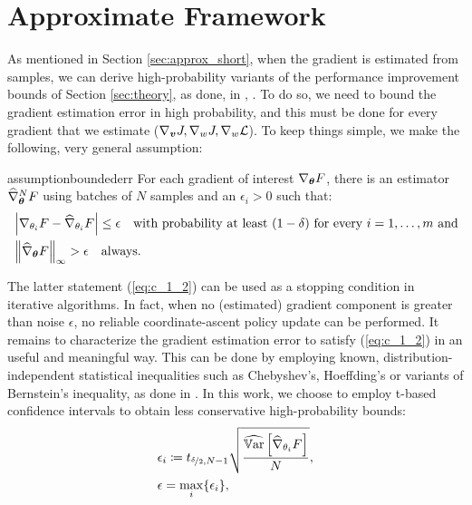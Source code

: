 \chapter{Approximate Framework}\label{sec:approx}
As mentioned in Section \ref{sec:approx_short}, when the gradient is estimated from samples, we can derive high-probability variants of the performance improvement bounds of Section \ref{sec:theory}, as done, \eg in \cite{adaptive_step}, \cite{adaptive_batch}.
To do so, we need to bound the gradient estimation error in high probability, and this must be done for every gradient that we estimate (\eg $\nabla_{\vv}J, \nabla_wJ, \nabla_w\mathcal{L}$). To keep things simple, we make the following, very general assumption:

\begin{restatable}[]{assumption}{boundederr}\label{ass:bounded_err}
	For each gradient of interest $\nabla_{\vtheta} F$, there is an estimator $\widehat{\nabla}_{\vtheta}^NF$ using batches of $N$ samples and an $\epsilon_i>0$ such that:
	\begin{align}
	&\left|\nabla_{\theta_i}F - \widehat{\nabla}_{\theta_i}F\right| \leq \epsilon 
		\quad\text{with probability at least $(1-\delta)$ for every $i=1,\dots,m$ and}\label{eq:c_1_1}\\
	&\norm[\infty]{\widehat{\nabla}_{\vtheta}F} > \epsilon\quad\text{always}.\label{eq:c_1_2}
	\end{align}
\end{restatable}
The latter statement (\ref{eq:c_1_2}) can be used as a stopping condition in iterative algorithms. In fact, when no (estimated) gradient component is greater than noise $\epsilon$, no reliable coordinate-ascent policy update can be performed. It remains to characterize the gradient estimation error to satisfy (\ref{eq:c_1_2}) in an useful and meaningful way. This can be done by employing known, distribution-independent statistical inequalities such as Chebyshev's, Hoeffding's or variants of Bernstein's inequality, as done in \cite{adaptive_batch}. In this work, we choose to employ t-based confidence intervals to obtain less conservative high-probability bounds:
\begin{align*}
	&\epsilon_i \coloneqq t_{\nicefrac{\delta}{2}, N-1}\sqrt{\frac{\widehat{\Var}\left[\widehat{\nabla}_{\theta_i}F\right]}
		{N}},\\
	&\epsilon = \max_i\{\epsilon_i\},
\end{align*}
